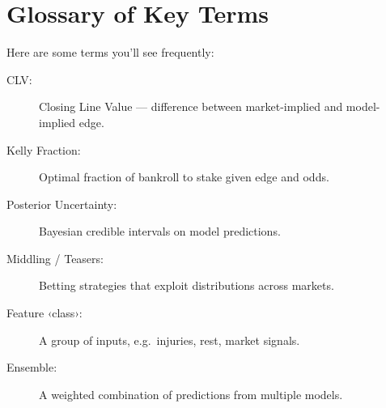 \section{Glossary of Key Terms}

Here are some terms you’ll see frequently:
\begin{description}
  \item[CLV:] Closing Line Value — difference between market-implied and model-implied edge.
  \item[Kelly Fraction:] Optimal fraction of bankroll to stake given edge and odds.
  \item[Posterior Uncertainty:] Bayesian credible intervals on model predictions.
  \item[Middling / Teasers:] Betting strategies that exploit distributions across markets.
  \item[Feature ‹class›:] A group of inputs, e.g.\ injuries, rest, market signals.
  \item[Ensemble:] A weighted combination of predictions from multiple models.
\end{description}


